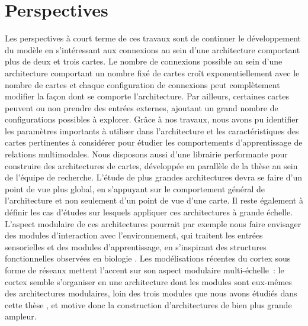 \section*{Perspectives}

Les perspectives à court terme de ces travaux sont de continuer le développement du modèle en s'intéressant aux connexions au sein d'une architecture comportant plus de deux et trois cartes.
Le nombre de connexions possible au sein d'une architecture comportant un nombre fixé de cartes croît exponentiellement avec le nombre de cartes et chaque configuration de connexions peut complètement modifier la façon dont se comporte l'architecture. Par ailleurs, certaines cartes peuvent ou non prendre des entrées externes, ajoutant un grand nombre de configurations possibles à explorer.
Grâce à nos travaux, nous avons pu identifier les paramètres importants à utiliser dans l'architecture et les caractéristiques des cartes pertinentes à considérer pour étudier les comportements d'apprentissage de relations multimodales. 
Nous disposons aussi d'une librairie performante pour construire des architectures de cartes, développée en parallèle de la thèse au sein de l'équipe de recherche.
L'étude de plus grandes architectures devra se faire d'un point de vue plus global, en s'appuyant sur le comportement général de l'architecture et non seulement d'un point de vue d'une carte. Il reste également à définir les cas d'études sur lesquels appliquer ces architectures à grande échelle.
L'aspect modulaire de ces architectures pourrait par exemple nous faire envisager des modules d'interaction avec l'environnement, qui traitent les entrées sensorielles et des modules d'apprentissage, en s'inspirant des structures fonctionnelles observées en biologie \cite{Ellefsen2015NeuralMH}. 
Les modélisations récentes du cortex sous forme de réseaux mettent l'accent sur son aspect modulaire multi-échelle~: le cortex semble s'organiser en une architecture dont les modules sont eux-mêmes des architectures modulaires, loin des trois modules que nous avons étudiés dans cette thèse \cite{betzel_multi-scale_2017}, et motive donc la construction d'architectures de bien plus grande ampleur.

